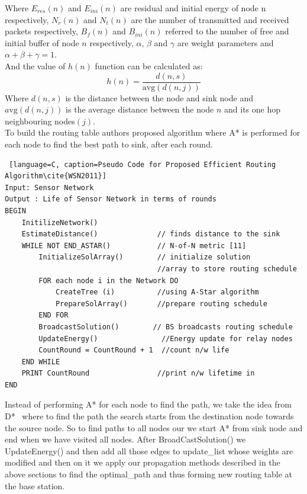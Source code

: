 \documentclass[a4paper]{article}
\begin{document}
Where $E_{res}(n)$ and $E_{ini}(n)$ are residual and initial energy of node n respectively, $N_r(n)$ and $N_t(n)$  are the number of transmitted and received packets respectively, $B_f(n)$ and $B_{ini}(n)$ referred to the number of free and initial buffer of node $n$ respectively, $\alpha$, $\beta$ and $\gamma$ are weight parameters and $\alpha + \beta + \gamma = 1$.\\
And the value of $h(n)$ function can be calculated as:
\begin{equation}
h(n) = \frac{d(n,s)}{\text{avg}(d(n,j))}
\end{equation} Where $d(n,s)$ is the distance between the node and sink node and $a\text{vg}(d(n,j))$ is the average distance between the node $n$ and its one hop neighbouring nodes$(j)$.\\
To build the routing table authors\cite{WSN2011} proposed algorithm where A* is performed for each node to find the best path to sink, after each round.
\begin{lstlisting} [language=C, caption=Pseudo Code for Proposed Efficient Routing Algorithm\cite{WSN2011}]
Input: Sensor Network
Output : Life of Sensor Network in terms of rounds
BEGIN
    InitilizeNetwork()
    EstimateDistance()              // finds distance to the sink
    WHILE NOT END_ASTAR()           // N-of-N metric [11]
        InitializeSolArray()        // initialize solution
                                    //array to store routing schedule
        FOR each node i in the Network DO
            CreateTree (i)          //using A-Star algorithm
            PrepareSolArray()       //prepare routing schedule
        END FOR
        BroadcastSolution()        // BS broadcasts routing schedule
        UpdateEnergy()               //Energy update for relay nodes
        CountRound = CountRound + 1  //count n/w life
    END WHILE
    PRINT CountRound                //print n/w lifetime in
END
\end{lstlisting}
Instead of performing A* for each node to find the path, we take the idea from D*~\cite{original_D_star} where to find the path the search starts from the destination node towards the source node. So to find paths to all nodes our we start A* from sink node and end when we have visited all nodes. After BroadCastSolution() we UpdateEnergy() and then add all those edges to update\_list whose weights are modified and then on it we apply our propagation methods described in the above sections to find the optimal\_path and thus forming new routing table at the base station.
\end{document}
